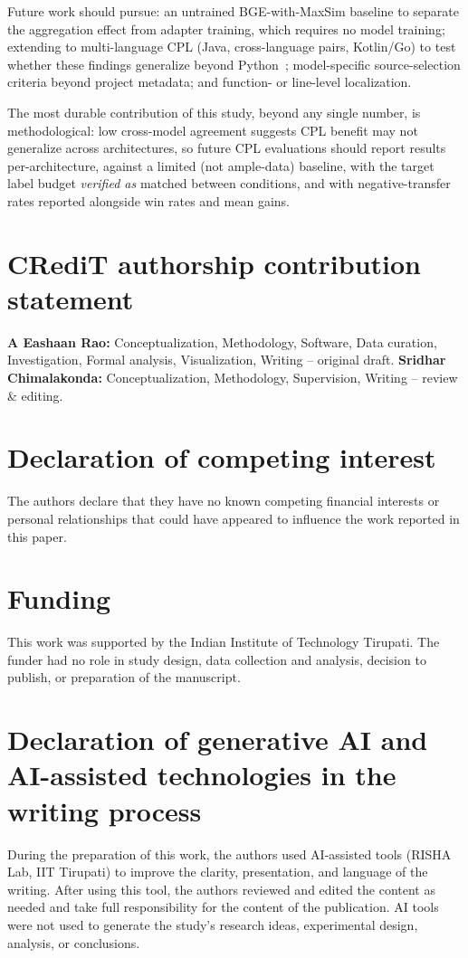 \documentclass[a4paper,fleqn]{cas-dc}
\begin{document}
Future work should pursue: an untrained BGE-with-MaxSim
baseline to separate the aggregation effect from adapter training, which
requires no model training; extending to multi-language CPL (Java,
cross-language pairs, Kotlin/Go) to
test whether these findings generalize beyond Python~\citep{yang2024multi};
model-specific source-selection criteria beyond project metadata; and
function- or line-level localization.

The most durable contribution of this study, beyond any single number, is
methodological: low cross-model agreement suggests CPL benefit may not
generalize across architectures, so future CPL evaluations should report
results per-architecture, against a limited (not ample-data) baseline, with the
target label budget \emph{verified as} matched between conditions, and with negative-transfer rates reported
alongside win rates and mean gains.

\section*{CRediT authorship contribution statement}
\textbf{A Eashaan Rao:} Conceptualization, Methodology, Software, Data curation,
Investigation, Formal analysis, Visualization, Writing -- original draft.
\textbf{Sridhar Chimalakonda:} Conceptualization, Methodology, Supervision,
Writing -- review \& editing.

\section*{Declaration of competing interest}
The authors declare that they have no known competing financial interests or
personal relationships that could have appeared to influence the work reported in
this paper.

\section*{Funding}
This work was supported by the Indian Institute of Technology Tirupati. The
funder had no role in study design, data collection and analysis, decision to
publish, or preparation of the manuscript.

\section*{Declaration of generative AI and AI-assisted technologies in the writing process}
During the preparation of this work, the authors used AI-assisted tools (RISHA
Lab, IIT Tirupati) to improve the clarity, presentation, and language of the
writing. After using this tool, the authors reviewed and edited the content as
needed and take full responsibility for the content of the publication. AI
tools were not used to generate the study's research ideas, experimental
design, analysis, or conclusions.
\end{document}
